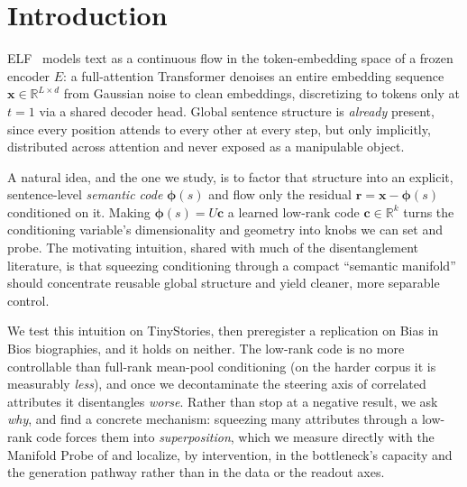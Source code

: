 \documentclass[11pt]{article}
\newcommand{\R}{\mathbb{R}}
\newcommand{\xb}{\bm{x}}
\newcommand{\rb}{\bm{r}}
\newcommand{\phib}{\bm{\phi}}
\newcommand{\cb}{\bm{c}}
\begin{document}
\section{Introduction}

ELF~\cite{elf2026} models text as a continuous flow in the token-embedding space of
a frozen encoder $E$: a full-attention Transformer denoises an entire embedding
sequence $\xb\in\R^{L\times d}$ from Gaussian noise to clean embeddings,
discretizing to tokens only at $t{=}1$ via a shared decoder head. Global sentence
structure is \emph{already} present, since every position attends to every other at
every step, but only implicitly, distributed across attention and never exposed as a
manipulable object.

A natural idea, and the one we study, is to factor that structure into an explicit,
sentence-level \emph{semantic code} $\phib(s)$ and flow only the residual
$\rb=\xb-\phib(s)$ conditioned on it. Making $\phib(s)=U\cb$ a learned low-rank code
$\cb\in\R^{k}$ turns the conditioning variable's dimensionality and geometry into
knobs we can set and probe. The motivating intuition, shared with much of the
disentanglement literature, is that squeezing conditioning through a compact
``semantic manifold'' should concentrate reusable global structure and yield cleaner,
more separable control.

We test this intuition on TinyStories, then preregister a replication on Bias
in Bios biographies, and it holds on neither. The low-rank code is no
more controllable than full-rank mean-pool conditioning (on the harder corpus it
is measurably \emph{less}), and once we decontaminate
the steering axis of correlated attributes it disentangles \emph{worse}. Rather than
stop at a negative result, we ask \emph{why}, and find a concrete mechanism:
squeezing many attributes through a low-rank code forces them into
\emph{superposition}, which we measure directly with the Manifold Probe of
\cite{manifold2026} and localize, by intervention, in the bottleneck's capacity and
the generation pathway rather than in the data or the readout axes.
\end{document}
